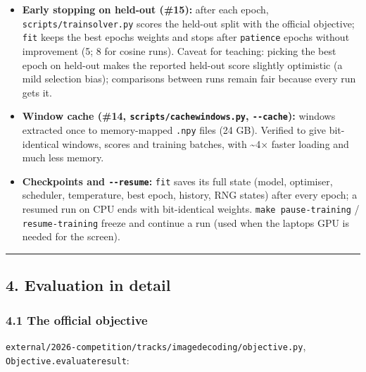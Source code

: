 \documentclass[
  11pt,
]{article}
\providecommand{\tightlist}{%
  \setlength{\itemsep}{0pt}\setlength{\parskip}{0pt}}
\renewcommand{\_}{\oldunderscore\allowbreak}
\begin{document}
\begin{itemize}
\tightlist
\item
  \textbf{Early stopping on held-out
  (\#15):} after each epoch,
  \texttt{scripts/train\_solver.py}
  scores the held-out split with the
  official objective; \texttt{fit} keeps
  the best epoch\textquotesingle s
  weights and stops after
  \texttt{patience} epochs without
  improvement (5; 8 for cosine runs).
  Caveat for teaching: picking the best
  epoch on held-out makes the reported
  held-out score slightly optimistic (a
  mild selection bias); comparisons
  between runs remain fair because every
  run gets it.
\item
  \textbf{Window cache (\#14,
  \texttt{scripts/cache\_windows.py},
  \texttt{-\/-cache}):} windows
  extracted once to memory-mapped
  \texttt{.npy} files (24 GB). Verified
  to give bit-identical windows, scores
  and training batches, with
  \textasciitilde4× faster loading and
  much less memory.
\item
  \textbf{Checkpoints and
  \texttt{-\/-resume}:} \texttt{fit}
  saves its full state (model,
  optimiser, scheduler, temperature,
  best epoch, history, RNG states) after
  every epoch; a resumed run on CPU ends
  with bit-identical weights.
  \texttt{make\ pause-training} /
  \texttt{resume-training} freeze and
  continue a run (used when the
  laptop\textquotesingle s GPU is needed
  for the screen).
\end{itemize}

\begin{center}\rule{0.5\linewidth}{0.5pt}\end{center}

\subsection{4. Evaluation in
detail}\label{evaluation-in-detail}

\subsubsection{4.1 The official
objective}\label{the-official-objective}

\texttt{external/2026-competition/tracks/image\_decoding/objective.py},
\texttt{Objective.evaluate\_result}:
\end{document}
